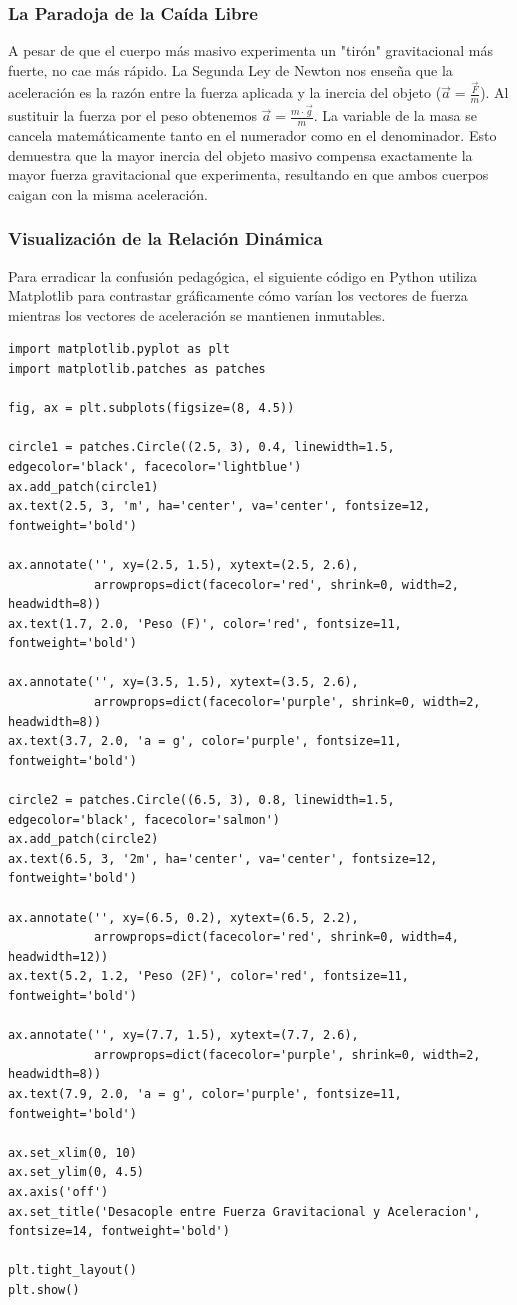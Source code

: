 \documentclass[12pt]{article}
\begin{document}
\subsubsection*{La Paradoja de la Caída Libre}
A pesar de que el cuerpo más masivo experimenta un "tirón" gravitacional más fuerte, no cae más rápido. La Segunda Ley de Newton nos enseña que la aceleración es la razón entre la fuerza aplicada y la inercia del objeto ($\vec{a} = \frac{\vec{F}}{m}$). Al sustituir la fuerza por el peso obtenemos $\vec{a} = \frac{m \cdot \vec{g}}{m}$. La variable de la masa se cancela matemáticamente tanto en el numerador como en el denominador. Esto demuestra que la mayor inercia del objeto masivo compensa exactamente la mayor fuerza gravitacional que experimenta, resultando en que ambos cuerpos caigan con la misma aceleración.

\subsubsection*{Visualización de la Relación Dinámica}
Para erradicar la confusión pedagógica, el siguiente código en Python utiliza Matplotlib para contrastar gráficamente cómo varían los vectores de fuerza mientras los vectores de aceleración se mantienen inmutables.

\begin{lstlisting}
import matplotlib.pyplot as plt
import matplotlib.patches as patches

fig, ax = plt.subplots(figsize=(8, 4.5))

circle1 = patches.Circle((2.5, 3), 0.4, linewidth=1.5, edgecolor='black', facecolor='lightblue')
ax.add_patch(circle1)
ax.text(2.5, 3, 'm', ha='center', va='center', fontsize=12, fontweight='bold')

ax.annotate('', xy=(2.5, 1.5), xytext=(2.5, 2.6), 
            arrowprops=dict(facecolor='red', shrink=0, width=2, headwidth=8))
ax.text(1.7, 2.0, 'Peso (F)', color='red', fontsize=11, fontweight='bold')

ax.annotate('', xy=(3.5, 1.5), xytext=(3.5, 2.6), 
            arrowprops=dict(facecolor='purple', shrink=0, width=2, headwidth=8))
ax.text(3.7, 2.0, 'a = g', color='purple', fontsize=11, fontweight='bold')

circle2 = patches.Circle((6.5, 3), 0.8, linewidth=1.5, edgecolor='black', facecolor='salmon')
ax.add_patch(circle2)
ax.text(6.5, 3, '2m', ha='center', va='center', fontsize=12, fontweight='bold')

ax.annotate('', xy=(6.5, 0.2), xytext=(6.5, 2.2), 
            arrowprops=dict(facecolor='red', shrink=0, width=4, headwidth=12))
ax.text(5.2, 1.2, 'Peso (2F)', color='red', fontsize=11, fontweight='bold')

ax.annotate('', xy=(7.7, 1.5), xytext=(7.7, 2.6), 
            arrowprops=dict(facecolor='purple', shrink=0, width=2, headwidth=8))
ax.text(7.9, 2.0, 'a = g', color='purple', fontsize=11, fontweight='bold')

ax.set_xlim(0, 10)
ax.set_ylim(0, 4.5)
ax.axis('off')
ax.set_title('Desacople entre Fuerza Gravitacional y Aceleracion', fontsize=14, fontweight='bold')

plt.tight_layout()
plt.show()
\end{lstlisting}
\end{document}
